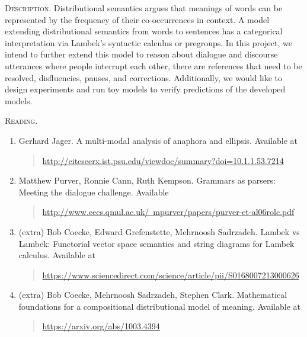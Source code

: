\documentclass[11pt, oneside]{article}
\begin{document}
\textsc{Description.}
Distributional semantics argues that meanings of words can
be represented by the frequency of their co-occurrences in
context. A model extending distributional semantics from
words to sentences has a categorical interpretation via
Lambek's syntactic calculus or pregroups. In this project,
we intend to further extend this model to reason about
dialogue and discourse utterances where people interrupt
each other, there are references that need to be resolved,
disfluencies, pauses, and corrections. Additionally, we
would like to design experiments and run toy models to
verify predictions of the
developed models.

\textsc{Reading.}
\begin{enumerate}
\item \label{ms1}
  Gerhard Jager. A multi-modal analysis of anaphora and
  ellipsis. Available at
  \begin{quote}    \href{http://citeseerx.ist.psu.edu/viewdoc/summary?doi=10.1.1.53.7214}{http://citeseerx.ist.psu.edu/viewdoc/summary?doi=10.1.1.53.7214}
  \end{quote}
\item \label{ms2}
  Matthew Purver, Ronnie Cann, Ruth Kempson. Grammars as
  parsers: Meeting the dialogue challenge. Available
  \begin{quote} \href{http://www.eecs.qmul.ac.uk/~mpurver/papers/purver-et-al06rolc.pdf}{http://www.eecs.qmul.ac.uk/~mpurver/papers/purver-et-al06rolc.pdf}
  \end{quote}
\item (extra) Bob Coecke, Edward Grefenstette, Mehrnoosh
  Sadrzadeh. Lambek vs Lambek: Functorial vector space
  semantics and string diagrams for Lambek
  calculus. Available at
  \begin{quote} \href{https://www.sciencedirect.com/science/article/pii/S0168007213000626}{https://www.sciencedirect.com/science/article/pii/S0168007213000626}
  \end{quote}
\item (extra) Bob Coecke, Mehrnoosh Sadrzadeh, Stephen
  Clark. Mathematical foundations for a compositional
  distributional model of meaning. Available at
  \begin{quote}
    \href{https://arxiv.org/abs/1003.4394}{https://arxiv.org/abs/1003.4394}
  \end{quote}
\end{enumerate}

\pagebreak

%
%
\end{document}
